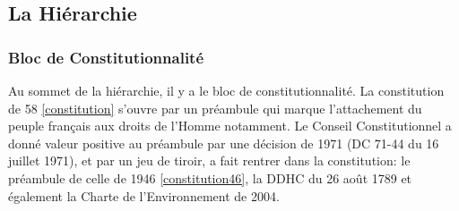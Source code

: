 \documentclass[math]{cours}
\begin{document}
\subsection{La Hiérarchie}
\subsubsection{Bloc de Constitutionnalité}
Au sommet de la hiérarchie, il y a le bloc de constitutionnalité.
La constitution de 58 \ref{constitution} s'ouvre par un préambule qui marque l'attachement du peuple français aux droits de l'Homme notamment.
Le Conseil Constitutionnel a donné valeur positive au préambule par une décision de 1971 (DC 71-44 du 16 juillet 1971), et par un jeu de tiroir, a fait rentrer dans la constitution: le préambule de celle de 1946 \ref{constitution46}, la DDHC du 26 août 1789 et également la Charte de l'Environnement de 2004.
\end{document}
